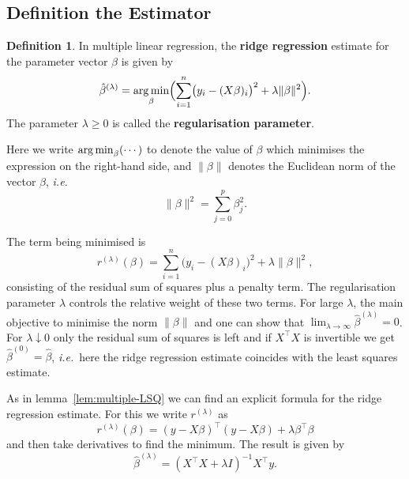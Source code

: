 \documentclass[
  a4paper,
]{article}
\theoremstyle{definition}
\newtheorem{definition}{Definition}[section]
\theoremstyle{definition}
\theoremstyle{definition}
\theoremstyle{definition}
\theoremstyle{remark}
\begin{document}
\subsection{Definition the Estimator}\label{definition-the-estimator}

\begin{definition}
In multiple linear regression, the \textbf{ridge regression} estimate for
the parameter vector \(\beta\) is given by
\begin{equation}
  \hat\beta^{(\lambda)}
  = \mathop{\mathrm{arg\,min}}\limits_\beta \Bigl(
      \sum_{i=1}^n \bigl( y_i - (X \beta)_i \bigr)^2
      + \lambda \|\beta\|^2
    \Bigr).
\end{equation}
The parameter \(\lambda \geq 0\) is called the \textbf{regularisation parameter}.
\end{definition}

Here we write \(\mathop{\mathrm{arg\,min}}\limits\nolimits_\beta (\cdots)\) to denote the value of \(\beta\)
which minimises the expression on the right-hand side, and \(\|\beta\|\)
denotes the Euclidean norm of the vector \(\beta\), \emph{i.e.}
\begin{equation*}
  \|\beta\|^2
  = \sum_{j=0}^p \beta_j^2.
\end{equation*}

The term being minimised is
\begin{equation*}
  r^{(\lambda)}(\beta)
  = \sum_{i=1}^n \bigl( y_i - (X \beta)_i \bigr)^2
      + \lambda \|\beta\|^2,
\end{equation*}
consisting of the residual sum of squares plus a penalty term. The
regularisation parameter \(\lambda\) controls the relative weight of these two
terms. For large \(\lambda\), the main objective to minimise the norm
\(\|\beta\|\) and one can show that \(\lim_{\lambda \to\infty}
\hat\beta^{(\lambda)} = 0\). For \(\lambda \downarrow 0\) only the residual sum
of squares is left and if \(X^\top X\) is invertible we get \(\hat\beta^{(0)} =
\hat\beta\), \emph{i.e.}~here the ridge regression estimate coincides with the least
squares estimate.

As in lemma~\ref{lem:multiple-LSQ} we can find an explicit formula
for the ridge regression estimate. For this we write \(r^{(\lambda)}\)
as
\begin{equation*}
  r^{(\lambda)}(\beta)
  = (y - X\beta)^\top (y - X\beta)
      + \lambda \beta^\top \beta
\end{equation*}
and then take derivatives to find the minimum. The result is
given by
\begin{equation}
  \hat\beta^{(\lambda)}
  = (X^\top X + \lambda I)^{-1} X^\top y.    \label{eq:1523}
\end{equation}
\end{document}

